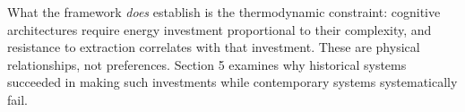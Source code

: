 What the framework \textit{does} establish is the thermodynamic constraint: cognitive architectures require energy investment proportional to their complexity, and resistance to extraction correlates with that investment. These are physical relationships, not preferences. Section 5 examines why historical systems succeeded in making such investments while contemporary systems systematically fail.

%
%
%
%
